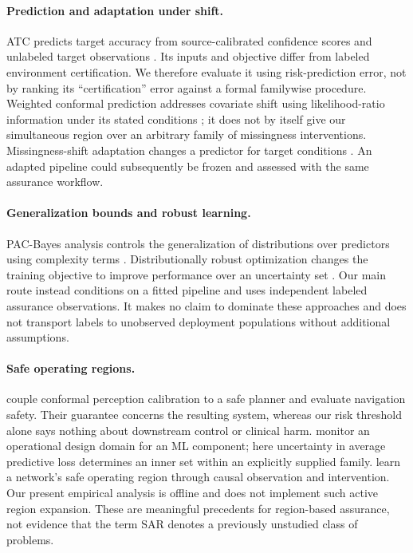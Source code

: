 \documentclass[twoside,11pt]{article}
\begin{document}
\paragraph{Prediction and adaptation under shift.}
ATC predicts target accuracy from source-calibrated confidence scores and unlabeled target
observations \citep{garg2022ood}. Its inputs and objective differ from labeled environment
certification. We therefore evaluate it using risk-prediction error, not by ranking its
``certification'' error against a formal familywise procedure. Weighted conformal prediction
addresses covariate shift using likelihood-ratio information under its stated conditions
\citep{tibshirani2019weighted}; it does not by itself give our simultaneous region over an
arbitrary family of missingness interventions. Missingness-shift adaptation changes a
predictor for target conditions \citep{zhou2023dams}. An adapted pipeline could subsequently
be frozen and assessed with the same assurance workflow.

\paragraph{Generalization bounds and robust learning.}
PAC-Bayes analysis controls the generalization of distributions over predictors using
complexity terms \citep{alquier2024}. Distributionally robust optimization changes the training
objective to improve performance over an uncertainty set \citep{duchi2021dro}. Our main route
instead conditions on a fitted pipeline and uses independent labeled assurance observations.
It makes no claim to dominate these approaches and does not transport labels to unobserved
deployment populations without additional assumptions.

\paragraph{Safe operating regions.}
\citet{dixit2025pwc} couple conformal perception calibration to a safe planner and evaluate
navigation safety. Their guarantee concerns the resulting system, whereas our risk threshold
alone says nothing about downstream control or clinical harm. \citet{torens2025odd} monitor an
operational design domain for an ML component; here uncertainty in average predictive loss
determines an inner set within an explicitly supplied family. \citet{hammar2026safe} learn a
network's safe operating region through causal observation and intervention. Our present
empirical analysis is offline and does not implement such active region expansion.
These are meaningful precedents for region-based assurance, not evidence that the term SAR
denotes a previously unstudied class of problems.
\end{document}
